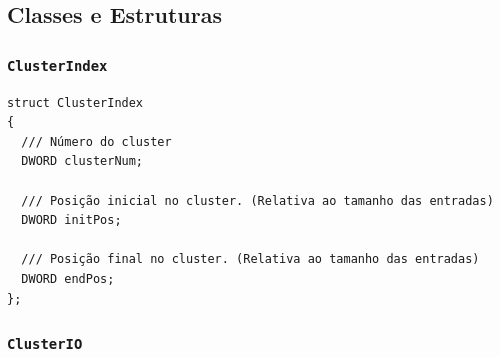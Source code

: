 \documentclass[
    12pt,				%
    oneside,   	        %
    a4paper,			%
    english,			%
    french,				%
    spanish,			%
    brazil,				%
    ]{pacotes/abntex2}
\begin{document}
\subsection{Classes e Estruturas}
\label{subsec:classes_estruturas}

\subsubsection{\texttt{ClusterIndex}}
\label{subsubsec:cluster_index}

\begin{lstlisting}[caption={Estrutura de indexação que referência o cluster da entrada}, label={lst:cluster_index}]
struct ClusterIndex
{
  /// Número do cluster 
  DWORD clusterNum;

  /// Posição inicial no cluster. (Relativa ao tamanho das entradas)
  DWORD initPos;

  /// Posição final no cluster. (Relativa ao tamanho das entradas) 
  DWORD endPos;
};
\end{lstlisting}

\subsubsection{\texttt{ClusterIO}}
\label{subsubsec:cluster_io}
\end{document}
